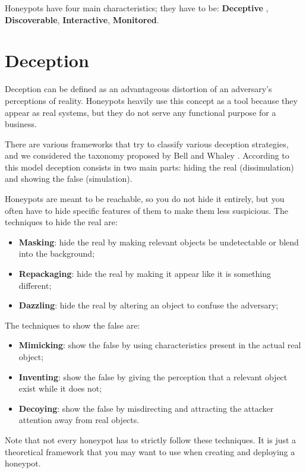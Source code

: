 \documentclass[epsfig,a4paper,11pt,titlepage,oneside,openany]{book}
\begin{document}
Honeypots have four main characteristics; they have to be: \textbf{Deceptive} , \textbf{Discoverable}, \textbf{Interactive}, \textbf{Monitored}.

\section{Deception}

Deception can be defined as an advantageous distortion of an adversary's perceptions of reality. Honeypots heavily use this concept as a tool because they appear as real systems, but they do not serve any functional purpose for a business.

There are various frameworks that try to classify various deception strategies, and we considered the taxonomy proposed by Bell and Whaley \cite{Whaley}. According to this model deception consists in two main parts: hiding the real (dissimulation) and showing the false (simulation).

Honeypots are meant to be reachable, so you do not hide it entirely, but you often have to hide specific features of them to make them less suspicious.
The techniques to hide the real are:
\begin{itemize}
\itemsep0em 
\item \textbf{Masking}: hide the  real by making relevant objects be undetectable or blend into the background;
\item \textbf{Repackaging}: hide the  real by making it appear like it is something different;
\item \textbf{Dazzling}: hide the real by altering an object to confuse the adversary;
\end{itemize}

The techniques to show the false are:
\begin{itemize}
\itemsep0em 
\item \textbf{Mimicking}: show the false by using characteristics present in the actual real object;
\item \textbf{Inventing}: show the false by giving the perception that a relevant object exist while it does not; 
\item \textbf{Decoying}: show the false by misdirecting and attracting the attacker attention away from real objects.
\end{itemize}
Note that not every honeypot has to strictly follow these techniques. It is just a theoretical framework that you may want to use when creating and deploying a honeypot. 
\end{document}
